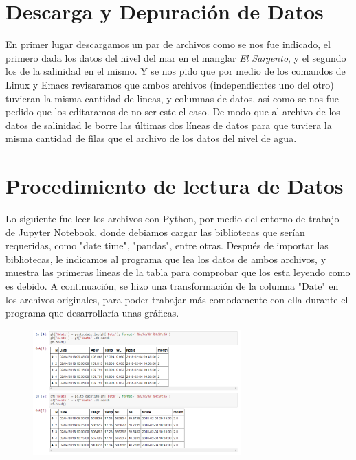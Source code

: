 \documentclass{article}
\begin{document}
\section{Descarga y Depuración de Datos}
En primer lugar descargamos un par de archivos como se nos fue indicado, el primero dada los datos del nivel del mar en el manglar \textit{El Sargento}, y el segundo los de la salinidad en el mismo. Y se nos pido que por medio de los comandos de Linux y Emacs revisaramos que ambos archivos (independientes uno del otro) tuvieran la misma cantidad de lineas, y columnas de datos, así como se nos fue pedido que los editaramos de no ser este el caso. 
De modo que al archivo de los datos de salinidad le borre las últimas dos líneas de datos para que tuviera la misma cantidad de filas que el archivo de los datos del nivel de agua. 

\section{Procedimiento de lectura de Datos}
Lo siguiente fue leer los archivos con Python, por medio del entorno de trabajo de Jupyter Notebook, donde debiamos cargar las bibliotecas que serían requeridas, como "date time", "pandas", entre otras. 
Después de importar las bibliotecas, le indicamos al programa que lea los datos de ambos archivos, y muestra las primeras lineas de la tabla para comprobar que los esta leyendo como es debido.
A continuación, se hizo una transformación de la columna "Date" en los archivos originales, para poder trabajar más comodamente con ella durante el programa que desarrollaría unas gráficas. 
\begin{figure}[htb]
    \begin{center}
    \includegraphics[width=8cm]{CambioDate.PNG}
    \end{center}
\end{figure}  
\end{document}
